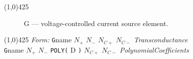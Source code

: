
\oddsidemargin 10mm \topmargin 0.0in \textwidth 5.5in \textheight 7.375in
\evensidemargin 1.0in \headheight 0.18in \footskip 0.16in
%
\section[G \- Voltage-Controlled Current Source]{}
\linethickness{1mm}
\line(1,0){425}
\normalsize
\begin{figure}[h]
\centerline{\epsfxsize=3in} \caption{G ---
voltage-controlled current source element.}
\end{figure}
\linethickness{0.5mm} \line(1,0){425}
\newline
\textit{Form:}
\newline
{\tt G}name $N_{+}$ $N_{-}$ $N_{C+}$ $N_{C-}$ {\it Transconductance}\\
     {\tt G}name $N_{+}$ $N_{-}$ {\tt POLY(} D {\tt )} $N_{C+}$ $N_{C-}$
        {\it PolynomialCoefficients}
\newline
